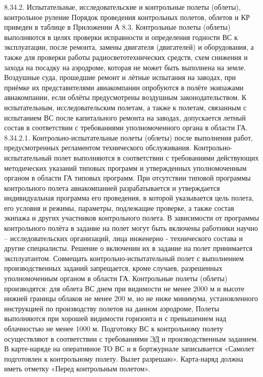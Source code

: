 8.34.2.	Испытательные, исследовательские и контрольные полеты (облеты), 
                                                            контрольное руление
Порядок проведения контрольных полетов, облетов и КР приведен в таблице в Приложении А 8.3.
Контрольные полеты (облеты) выполняются в целях проверки исправности и определения годности ВС к эксплуатации, после ремонта, замены двигателя (двигателей) и оборудования, а также для проверки работы радиосветотехнических средств, схем снижения и захода на посадку на аэродроме, которая не может быть выполнена на земле. Воздушные суда, прошедшие ремонт и лётные испытания на заводах, при приёмке их представителями авиакомпании опробуются в полёте экипажами авиакомпании, если облёты предусмотрены воздушным законодательством.
К испытательным, исследовательским полетам, а также к полетам, связанным с испытанием ВС после капитального ремонта на заводах, допускается летный состав в соответствии с требованиями уполномоченного органа в области ГА.
8.34.2.1. Контрольно-испытательные полеты (облеты) после выполнения работ, предусмотренных регламентом технического обслуживания.
Контрольно-испытательный полет выполняются в соответствии с требованиями действующих методических указаний типовых программ и утвержденных уполномоченным органом в области ГА типовых программ.
При отсутствии типовой программы контрольного полета авиакомпанией разрабатывается и утверждается индивидуальная программа его проведения, в которой указывается цель полета, его условия и режимы, параметры, подлежащие проверке, а также состав экипажа и других участников контрольного полета.
В зависимости от программы контрольного полёта в задание на полет могут быть включены работники научно – исследовательских организаций, лица инженерно - технического состава и другие специалисты. Решение о включении их в задание на полет принимается эксплуатантом. 
Совмещать контрольно-испытательный полет с выполнением производственных заданий запрещается, кроме случаев, разрешенных уполномоченным органом в области ГА.
Контрольные полеты (облеты) производятся: для облета ВС днем при видимости не менее 2000 м и высоте нижней границы облаков не менее 200 м, но не ниже минимума, установленного инструкцией по производству полетов на данном аэродроме, 
Полеты выполняются при хорошей видимости горизонта и с превышением над облачностью не менее 1000 м.
Подготовку ВС к контрольному полету осуществляют в соответствии с требованиями ЭД и производственным заданием. В карте-наряде на оперативное ТО ВС и в бортжурнале записывается «Самолет подготовлен к контрольному полету. Вылет разрешаю». Карта-наряд должна иметь отметку «Перед контрольным полетом».
